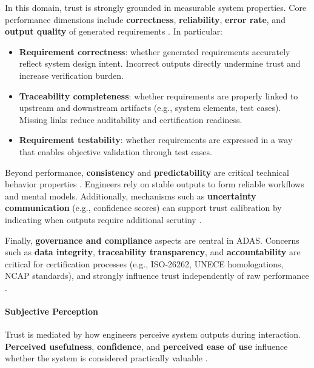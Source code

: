 \documentclass[sigconf]{acmart}
\begin{document}
In this domain, trust is strongly grounded in measurable system properties. Core performance dimensions include \textbf{correctness}, \textbf{reliability}, \textbf{error rate}, and \textbf{output quality} of generated requirements \cite{afroogh_trust_in_ai, Rheuetal.2020.SystematicReviewTrustBuildingFactors}. In particular:

\begin{itemize}[leftmargin=*, label=\textbullet]
    \item \textbf{Requirement correctness}: whether generated requirements accurately reflect system design intent. Incorrect outputs directly undermine trust and increase verification burden.
    
    \item \textbf{Traceability completeness}: whether requirements are properly linked to upstream and downstream artifacts (e.g., system elements, test cases). Missing links reduce auditability and certification readiness.
    
    \item \textbf{Requirement testability}: whether requirements are expressed in a way that enables objective validation through test cases.
\end{itemize}

Beyond performance, \textbf{consistency} and \textbf{predictability} are critical technical behavior properties \cite{yang_wibowo_2022, carsten_hmi_automated_cars}. Engineers rely on stable outputs to form reliable workflows and mental models. Additionally, mechanisms such as \textbf{uncertainty communication} (e.g., confidence scores) can support trust calibration by indicating when outputs require additional scrutiny \cite{Buçinca_Proxy_tasks, haeuslschmid_SupportingTrustAutonomousDriving}.

Finally, \textbf{governance and compliance} aspects are central in ADAS. Concerns such as \textbf{data integrity}, \textbf{traceability transparency}, and \textbf{accountability} are critical for certification processes (e.g., ISO-26262, UNECE homologations, NCAP standards), and strongly influence trust independently of raw performance \cite{Aldoseri_et_al_2023, choudhury_chat_gpt}.

\paragraph{Subjective Perception}

Trust is mediated by how engineers perceive system outputs during interaction. \textbf{Perceived usefulness}, \textbf{confidence}, and \textbf{perceived ease of use} influence whether the system is considered practically valuable \cite{zhang_automated_vehicle_acceptance, schepman_general_attitude, choudhury_chat_gpt}.
\end{document}
